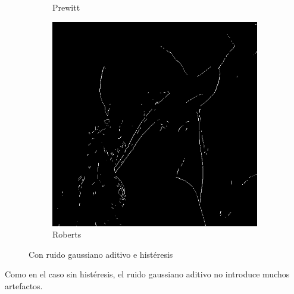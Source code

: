 \documentclass[a4paper]{article}
\begin{document}
\begin{figure}[H]
\begin{subfigure}[t]{0.3\textwidth}
	\caption{Prewitt}
	\end{subfigure}
	\begin{subfigure}[t]{0.3\textwidth}
	\centering
	\includegraphics[width=\textwidth]{imagenesInforme/lenaHysteresisGaussianRoberts}
	\caption{Roberts}
	\end{subfigure}
\caption{Con ruido gaussiano aditivo e histéresis}
\end{figure}

Como en el caso sin histéresis, el ruido gaussiano aditivo no introduce muchos artefactos.
\end{document}
